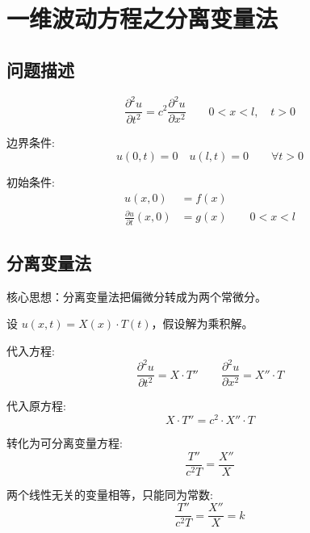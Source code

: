 \documentclass[12pt,a4paper]{article}
\numberwithin{subsection}{section}   %
\numberwithin{subsubsection}{subsection}
\theoremstyle{plain}
\theoremstyle{definition}
\theoremstyle{remark}
\theoremstyle{verification}
\begin{document}
	
	
	\section{一维波动方程之分离变量法}
	\subsection{问题描述}
	\begin{equation} \label{eq:wave_equation}
		\frac{\partial^2 u}{\partial t^2} = c^2 \frac{\partial^2 u}{\partial x^2} \qquad 0 < x < l, \quad t > 0
	\end{equation}
	
	边界条件:
	\begin{equation} \label{eq:boundary_conditions}
		u(0, t) = 0 \quad u(l, t) = 0 \qquad \forall t > 0
	\end{equation}
	
	初始条件:
	\begin{equation} \label{eq:initial_conditions}
		\begin{aligned}
			u(x, 0) &= f(x) \\
			\frac{\partial u}{\partial t}(x, 0) &= g(x) \qquad 0 < x < l
		\end{aligned}
	\end{equation}
	
	\subsection{分离变量法}
	核心思想：分离变量法把偏微分转成为两个常微分。
	
	设 \(u(x, t) = X(x) \cdot T(t)\)，假设解为乘积解。
	
	代入方程:
	\begin{equation} \label{eq:substitution}
		\frac{\partial^2 u}{\partial t^2} = X \cdot T'' \qquad \frac{\partial^2 u}{\partial x^2} = X'' \cdot T
	\end{equation}
	
	代入原方程:
	\begin{equation} \label{eq:original_substitution}
		X \cdot T'' = c^2 \cdot X'' \cdot T
	\end{equation}
	
	转化为可分离变量方程:
	\begin{equation} \label{eq:separation}
		\frac{T''}{c^2 T} = \frac{X''}{X}
	\end{equation}
	
	两个线性无关的变量相等，只能同为常数:
	\begin{equation} \label{eq:constant}
		\frac{T''}{c^2 T} = \frac{X''}{X} = k
	\end{equation}
	
\end{document}
